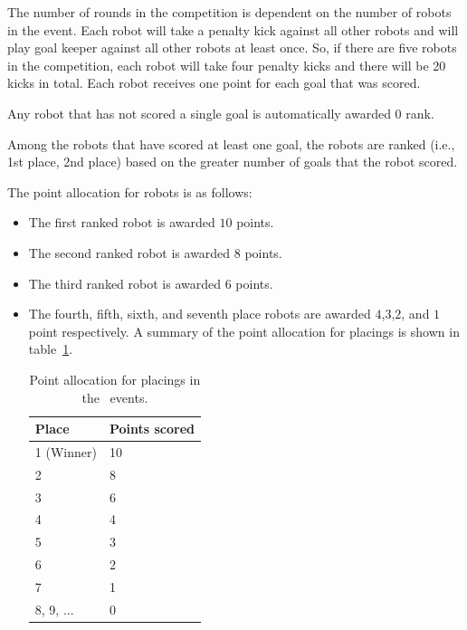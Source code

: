 \documentclass[12pt]{hurocup}
\begin{document}
\begin{lawlist}[PK]

\item The number of rounds in the competition is dependent on the
  number of robots in the event. Each robot will take a penalty kick
  against all other robots and will play goal keeper against all other
  robots at least once. So, if there are five robots in the competition,
  each robot will take four penalty kicks and there will be 20 kicks in
  total. Each robot receives one point for each goal that was scored.

\item Any robot that has not scored a single goal is automatically
  awarded 0 rank.
\item Among the robots that have scored at least one goal, the robots
  are ranked (i.e., 1st place, 2nd place) based on the greater number
  of goals that the robot scored.

\item The point allocation for robots is as follows:
  \begin{itemize}
  \item The first ranked robot is awarded $10$ points.
  \item The second ranked robot is awarded $8$ points.
  \item The third ranked robot is awarded $6$ points.
  \item The fourth, fifth, sixth, and seventh place robots are awarded
    $4$,$3$,$2$, and $1$ point respectively.  A summary of the point
    allocation for placings is shown in table~\ref{point-allocation}.

    \begin{table}
      \begin{center}
        \begin{tabular}{l|l}
          \hline
          Place & Points scored \\
          \hline
          1 (Winner) & 10 \\
          2          & 8 \\
          3          & 6 \\
          4          & 4 \\
          5          & 3 \\
          6          & 2 \\
          7          & 1 \\
          8, 9, ...  & 0 \\
          \hline
        \end{tabular}
      \end{center}
      \caption{Point allocation for placings in the \HuroCup\ events.}
      \label{point-allocation}
    \end{table}
 \end{itemize}


\end{lawlist}
\end{document}
